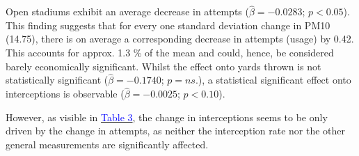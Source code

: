 \documentclass[12pt,a4paper]{article}
\newcommand{\mylink}[2]{\hyperref[#1]{\textcolor{blue}{#2}}}
\begin{document}
{\noindent Open stadiums exhibit an average decrease in attempts ($\hat{\beta} = -0.0283$; $p < 0.05$). This finding suggests that for every one standard deviation change in PM10 (14.75), there is on average a corresponding decrease in attempts (usage) by 0.42. This accounts for approx. 1.3 \% of the mean and could, hence, be considered barely economically significant. Whilst the effect onto yards thrown is not statistically significant ($\hat{\beta} = -0.1740$; $p = ns.$), a statistical significant effect onto interceptions is observable ($\hat{\beta} = -0.0025$; $p < 0.10$).

\clearpage
However, as visible in \mylink{T1}{Table 3}, the change in interceptions seems to be only driven by the change in attempts, as neither the interception rate nor the other general measurements are significantly affected. 

}
\end{document}
